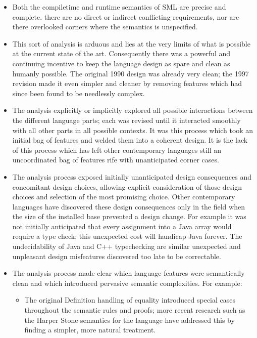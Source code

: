 \begin{itemize}

\item Both the compiletime and runtime semantics of SML are precise and complete. 
      there are no direct or indirect conflicting requirements, nor are there overlooked 
      corners where the semantics is unspecified. 

\item This sort of analysis is arduous and lies at the very limits of 
      what is possible at the current state of the art.  Consequently 
      there was a powerful and continuing incentive to keep the language 
      design as spare and clean as humanly possible.  The original 1990 
      design was already very clean;  the 1997 revision made it even 
      simpler and cleaner by removing features which had since been found 
      to be needlessly complex. 

\item The analysis explicitly or implicitly explored all possible interactions 
      between the different language parts;  each was revised until it interacted 
      smoothly with all other parts in all possible contexts.  It was this process 
      which took an initial bag of features and welded them into a coherent design. 
      It is the lack of this process which has left other contemporary languages 
      still an uncoordinated bag of features rife with unanticipated corner cases. 

\item The analysis process exposed initially unanticipated design consequences 
      and concomitant design choices, allowing explicit consideration of those 
      design choices and selection of the most promising choice.  Other contemporary 
      languages have discovered these design consequences only in the field when the 
      size of the installed base prevented a design change.  For example it was not 
      initially anticipated that every assignment into a Java array would require a 
      type check;  this unexpected cost will handicap Java forever.  The undecidability 
      of Java and C++ typechecking are similar unexpected and unpleasant design misfeatures 
      discovered too late to be correctable. 
      
\item The analysis process made clear which language features were semantically clean 
      and which introduced pervasive semantic complexities.  For example: 
    \begin{itemize} 
    \item The original Definition  handling of equality introduced special cases throughout 
          the semantic rules and proofs;  more recent research such as the Harper Stone 
          semantics for the language have addressed this by finding a simpler, more natural treatment. 


\end{itemize}
\end{itemize}
